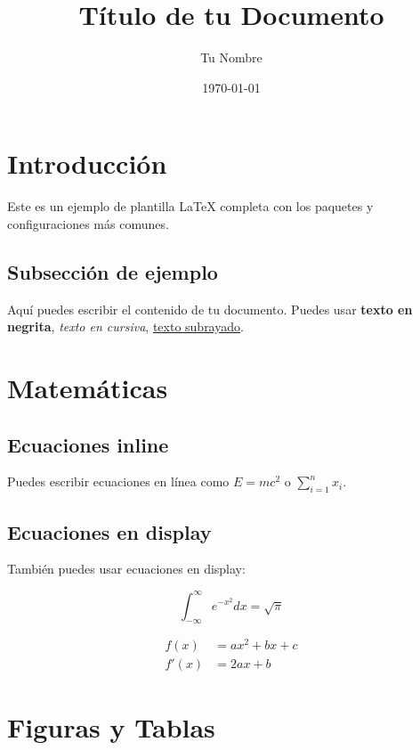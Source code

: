 \documentclass[12pt,a4paper]{article}
\title{Título de tu Documento}
\author{Tu Nombre}
\date{\today}
\begin{document}
\maketitle
\thispagestyle{empty}

\newpage
\tableofcontents
\newpage


\section{Introducción}

Este es un ejemplo de plantilla LaTeX completa con los paquetes y configuraciones más comunes.

\subsection{Subsección de ejemplo}

Aquí puedes escribir el contenido de tu documento. Puedes usar \textbf{texto en negrita}, \textit{texto en cursiva}, \underline{texto subrayado}.

\section{Matemáticas}

\subsection{Ecuaciones inline}
Puedes escribir ecuaciones en línea como $E = mc^2$ o $\sum_{i=1}^{n} x_i$.

\subsection{Ecuaciones en display}
También puedes usar ecuaciones en display:

\begin{equation}
    \int_{-\infty}^{\infty} e^{-x^2} dx = \sqrt{\pi}
\end{equation}

\begin{align}
    f(x) &= ax^2 + bx + c \\
    f'(x) &= 2ax + b
\end{align}

\section{Figuras y Tablas}
\end{document}
